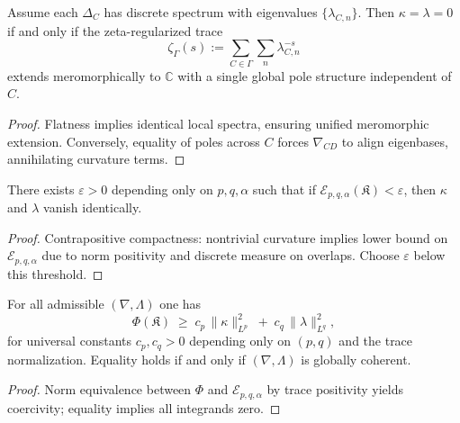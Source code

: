 \begin{theorem}\label{thm:spectral-coherence}
Assume each $\Delta_C$ has discrete spectrum with eigenvalues $\{\lambda_{C,n}\}$.
Then $\kappa=\lambda=0$ if and only if the zeta-regularized trace
\[
\zeta_{\Gamma}(s):=\sum_{C\in\Gamma}\sum_{n}\lambda_{C,n}^{-s}
\]
extends meromorphically to $\mathbb C$ with a single global pole structure independent of $C$.
\end{theorem}

\begin{proof}
Flatness implies identical local spectra, ensuring unified meromorphic extension. 
Conversely, equality of poles across $C$ forces $\nabla_{CD}$ to align eigenbases, annihilating curvature terms. \relax
\end{proof}


\begin{lemma}\label{lem:small-energy}
There exists $\varepsilon>0$ depending only on $p,q,\alpha$ such that if $\mathcal E_{p,q,\alpha}(\mathfrak K)<\varepsilon$, then $\kappa$ and $\lambda$ vanish identically.
\end{lemma}

\begin{proof}
Contrapositive compactness: nontrivial curvature implies lower bound on $\mathcal E_{p,q,\alpha}$ due to norm positivity and discrete measure on overlaps. Choose $\varepsilon$ below this threshold. \relax
\end{proof}

\begin{theorem}\label{thm:quantitative-coherence}
For all admissible $(\nabla,\Lambda)$ one has
\[
\Phi(\mathfrak K)\;\geqslant\;c_p\,\|\kappa\|_{L^p}^2\;+\;c_q\,\|\lambda\|_{L^q}^2,
\]
for universal constants $c_p,c_q>0$ depending only on $(p,q)$ and the trace normalization. 
Equality holds if and only if $(\nabla,\Lambda)$ is globally coherent.
\end{theorem}

\begin{proof}
Norm equivalence between $\Phi$ and $\mathcal E_{p,q,\alpha}$ by trace positivity yields coercivity; equality implies all integrands zero. \relax
\end{proof}

